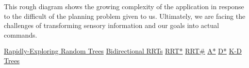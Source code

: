 \documentclass[twocolumn]{article}
\begin{document}
This rough diagram shows the growing complexity of the application in response to the difficult of the planning problem given to us. Ultimately, we are facing the challenges of transforming sensory information and our goals into actual commands.
\begin{thebibliography}{10}
 \href{http://msl.cs.uiuc.edu/rrt/papers.html}{Rapidly-Exploring Random Trees}
 \href{http://people.csail.mit.edu/aperez/obirrt/}{Bidirectional RRTs}
 \href{http://sertac.scripts.mit.edu/web/?page_id=15}{RRT*}
 \href{http://ieeexplore.ieee.org/xpl/login.jsp?tp=&arnumber=6630906&url=http://ieeexplore.ieee.org/iel7/6615630/6630547/06630906.pdf?arnumber=6630906}{RRT\#}
 \href{http://dl.acm.org/citation.cfm?id=3830&coll=portal&dl=ACM}{A*}
 \href{http://citeseerx.ist.psu.edu/viewdoc/summary?doi=10.1.1.41.8257}{D*}
 \href{https://www.cise.ufl.edu/class/cot5520fa09/CG_RangeKDtrees.pdf}{K-D Trees}


\end{thebibliography}
\end{document}
